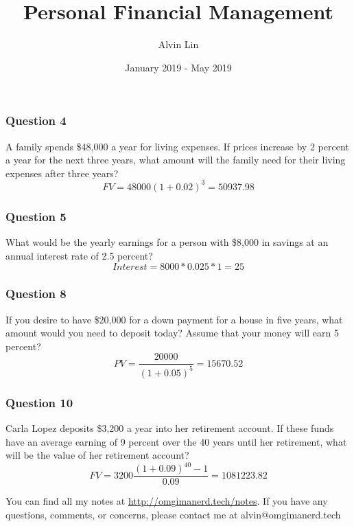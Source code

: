 \documentclass{math}
\title{Personal Financial Management}
\author{Alvin Lin}
\date{January 2019 - May 2019}
\begin{document}
\maketitle

\subsubsection*{Question 4}
A family spends \$48,000 a year for living expenses. If prices increase by 2
percent a year for the next three years, what amount will the family need for
their living expenses after three years?
\[ FV = 48000(1+0.02)^3 = 50937.98 \]

\subsubsection*{Question 5}
What would be the yearly earnings for a person with \$8,000 in savings at an
annual interest rate of 2.5 percent?
\[ Interest = 8000 * 0.025 * 1 = 25 \]

\subsubsection*{Question 8}
If you desire to have \$20,000 for a down payment for a house in five years,
what amount would you need to deposit today? Assume that your money will earn
5 percent?
\[ PV = \frac{20000}{(1+0.05)^5} = 15670.52 \]

\subsubsection*{Question 10}
Carla Lopez deposits \$3,200 a year into her retirement account. If these funds
have an average earning of 9 percent over the 40 years until her retirement,
what will be the value of her retirement account?
\[ FV = 3200\frac{(1+0.09)^{40}-1}{0.09} = 1081223.82 \]

\begin{center}
  You can find all my notes at \url{http://omgimanerd.tech/notes}. If you have
  any questions, comments, or concerns, please contact me at
  alvin@omgimanerd.tech
\end{center}
\end{document}
